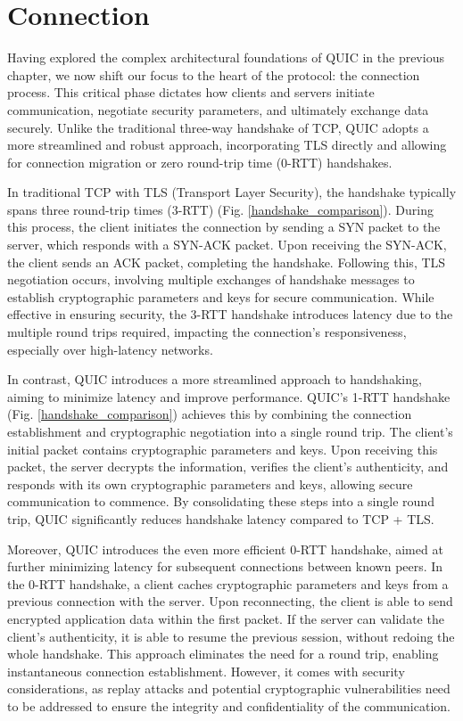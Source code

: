 \section{Connection}

Having explored the complex architectural foundations of QUIC in the previous chapter, we now shift our focus to the heart of the protocol: the connection process. This critical phase dictates how clients and servers initiate communication, negotiate security parameters, and ultimately exchange data securely. Unlike the traditional three-way handshake of TCP, QUIC adopts a more streamlined and robust approach, incorporating TLS directly and allowing for connection migration or zero round-trip time (0-RTT) handshakes.

In traditional TCP with TLS (Transport Layer Security), the handshake typically spans three round-trip times (3-RTT) (Fig. \ref{handshake_comparison}). During this process, the client initiates the connection by sending a SYN packet to the server, which responds with a SYN-ACK packet. Upon receiving the SYN-ACK, the client sends an ACK packet, completing the handshake. Following this, TLS negotiation occurs, involving multiple exchanges of handshake messages to establish cryptographic parameters and keys for secure communication. While effective in ensuring security, the 3-RTT handshake introduces latency due to the multiple round trips required, impacting the connection's responsiveness, especially over high-latency networks.

In contrast, QUIC introduces a more streamlined approach to handshaking, aiming to minimize latency and improve performance. QUIC's 1-RTT handshake (Fig. \ref{handshake_comparison}) achieves this by combining the connection establishment and cryptographic negotiation into a single round trip. The client's initial packet contains cryptographic parameters and keys. Upon receiving this packet, the server decrypts the information, verifies the client's authenticity, and responds with its own cryptographic parameters and keys, allowing secure communication to commence. By consolidating these steps into a single round trip, QUIC significantly reduces handshake latency compared to TCP + TLS.

Moreover, QUIC introduces the even more efficient 0-RTT handshake, aimed at further minimizing latency for subsequent connections between known peers. In the 0-RTT handshake, a client caches cryptographic parameters and keys from a previous connection with the server. Upon reconnecting, the client is able to send encrypted application data within the first packet. If the server can validate the client's authenticity, it is able to resume the previous session, without redoing the whole handshake. This approach eliminates the need for a round trip, enabling instantaneous connection establishment. However, it comes with security considerations, as replay attacks and potential cryptographic vulnerabilities need to be addressed to ensure the integrity and confidentiality of the communication.

